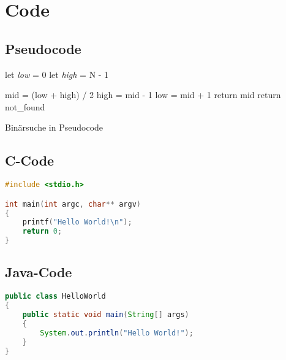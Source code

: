 \chapter{Code}

\section{Pseudocode}

\begin{algorithm}[H]
  let \textit{low} = 0
  let \textit{high} = N - 1
  
  {
    mid = (low + high) / 2\;
    {
      high = mid - 1\;
    }
    {
      {
	low = mid + 1\;
      }
      {
	return mid\;
      }
    }
    return not\_found\;
  }
  \label{binary_search}
  \caption{Binärsuche in Pseudocode}
\end{algorithm}

\section{C-Code}

\begin{lstlisting}[language=c]
#include <stdio.h>

int main(int argc, char** argv)
{
	printf("Hello World!\n");
	return 0;
}
\end{lstlisting}


\section{Java-Code}

\begin{lstlisting}[language=java]
public class HelloWorld 
{
	public static void main(String[] args)
	{
		System.out.println("Hello World!");
	}
}
\end{lstlisting}

% 
% 
